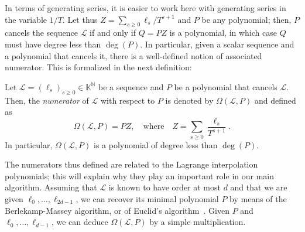 \documentclass[final,1p,times,authoryear]{elsarticle}
\newcommand{\genseries}{Z}
\newcommand{\minpoly}{P}
\def\M {\ensuremath{\mathsf{M}}}
\def\N {\ensuremath{\mathbb{N}}}
\def\K{\mathbb{K}}
\def\K {\ensuremath{\mathbb{K}}}
\begin{document}
In terms of generating series, it is easier to work here with
generating series in the variable $1/T$.  Let thus $\genseries =
\sum_{s\ge0} \ell_s / T^{s+1}$ and $\minpoly$ be any polynomial; then,
$\minpoly$ cancels the sequence $\mathcal{L}$ if and only if
$Q=\minpoly \genseries $ is a polynomial, in which case $Q$ must have
degree less than $\deg(\minpoly)$.  In particular, given a scalar
sequence and a polynomial that cancels it, there is a well-defined
notion of associated numerator. This is formalized in the next
definition:
\begin{definition}
  \label{def:omega}
  Let $\mathcal{L}=(\ell_s)_{s \ge 0}\in \K^\N$ be a sequence and $P$ be a
  polynomial that cancels $\mathcal{L}$. Then, the {\em numerator} of $\mathcal{L}$
  with respect to $P$ is denoted by $\Omega(\mathcal{L},P)$ and defined as 
  \[
    \Omega(\mathcal{L},P) = P \genseries, \quad\text{where}\quad
    \genseries=\sum_{s \ge 0} \frac {\ell_s}{T^{s+1}}.
  \]
  In particular, $\Omega(\mathcal{L},P)$ is a polynomial of
  degree less than $\deg(P)$.
\end{definition}


The numerators thus defined are related to the Lagrange interpolation
polynomials; this will explain why they play an important role in our
main algorithm. Assuming that $\mathcal{L}$ is known to have order at
most $d$ and that we are given $\ell_0,\dots,\ell_{2d-1}$, we can recover
its minimal polynomial $P$ by means of the Berlekamp-Massey algorithm,
or of Euclid's algorithm~\citep{BrGuYu80}. Given $P$ and
$\ell_0,\dots,\ell_{d-1}$, we can deduce
$\Omega(\mathcal{L},P)$ by a simple multiplication.

\end{document}
